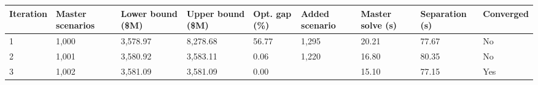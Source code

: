 \begin{tabular}{lllllllll}
\toprule
Iteration & Master scenarios & Lower bound (\$M) & Upper bound (\$M) & Opt. gap (\%) & Added scenario & Master solve (s) & Separation (s) & Converged \\
\midrule
1 & 1,000 & 3,578.97 & 8,278.68 & 56.77 & 1,295 & 20.21 & 77.67 & No \\
2 & 1,001 & 3,580.92 & 3,583.11 & 0.06 & 1,220 & 16.80 & 80.35 & No \\
3 & 1,002 & 3,581.09 & 3,581.09 & 0.00 &  & 15.10 & 77.15 & Yes \\
\bottomrule
\end{tabular}
